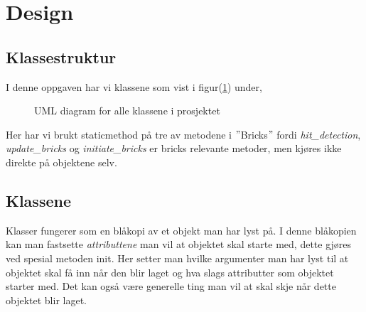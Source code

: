 \documentclass{article}     %
\begin{document}
\clearpage


\section{Design}
\subsection{Klassestruktur}
I denne oppgaven har vi klassene som vist i figur(\ref{UML}) under,

\begin{figure}[h!]
\caption{UML diagram for alle klassene i prosjektet}
\label{UML}
\end{figure}

Her har vi brukt staticmethod på tre av metodene i $"$Bricks$"$ fordi \emph{hit\_detection}, \emph{update\_bricks} og \emph{initiate\_bricks} er bricks relevante metoder, men kjøres ikke direkte på objektene selv.
\subsection{Klassene}

Klasser fungerer som en blåkopi av et objekt man har lyst på. I denne blåkopien kan man fastsette \emph{attributtene} man vil at objektet skal starte med, dette gjøres ved spesial metoden init. Her setter man hvilke argumenter man har lyst til at objektet skal få inn når den blir laget og hva slags attributter som objektet starter med. Det kan også være generelle ting man vil at skal skje når dette objektet blir laget.
\end{document}
